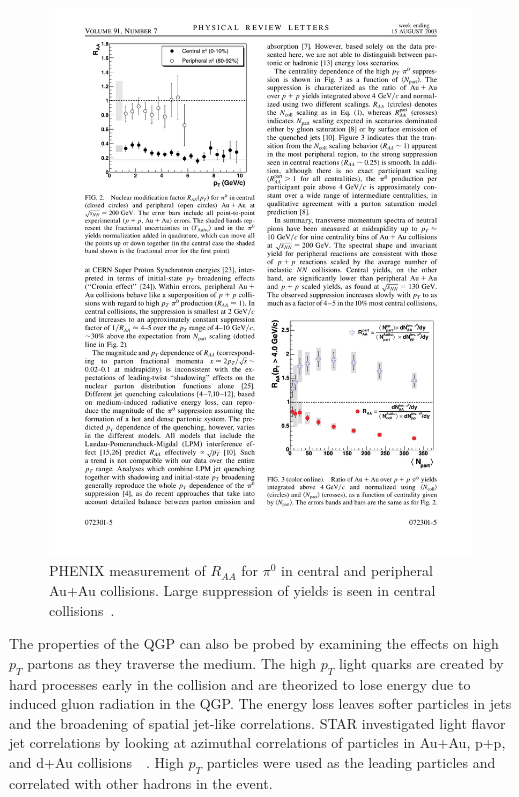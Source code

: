 \begin{figure}[htbp]
\begin{center}
\includegraphics[scale=1.2]{Plots/Intro/pi_RAA.pdf}
\end{center}
\caption[$R_{AA}$ for $\pi^0$]{PHENIX measurement of $R_{AA}$ for $\pi^0$ in central and peripheral Au+Au collisions. Large suppression of yields is seen in central collisions~\cite{PHENIXpiRAA}.}
\label{fig:piRAA}
\end{figure}

The properties of the QGP can also be probed by examining the effects on high $p_T$ partons as they traverse the medium. The high $p_T$ light quarks are created by hard processes early in the collision and are theorized to lose energy due to induced gluon radiation in the QGP. The energy loss leaves softer particles in jets and the broadening of spatial jet-like correlations. STAR investigated light flavor jet correlations by looking at azimuthal correlations of particles in Au+Au, p+p, and d+Au collisions~\cite{STARjetsuppr}~\cite{STARdihad}. High $p_T$ particles were used as the leading particles and correlated with other hadrons in the event.

